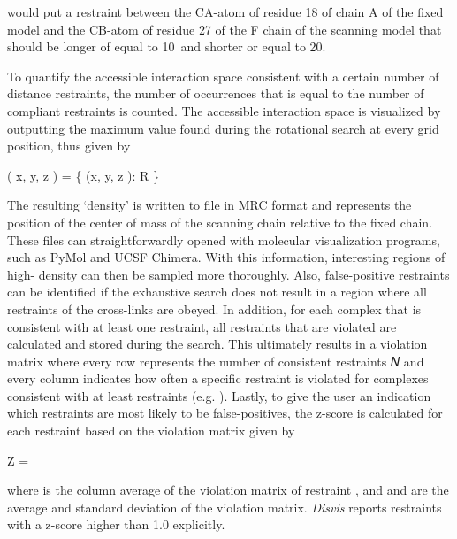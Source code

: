 would put a restraint between the CA-atom of residue 18 of chain A of the fixed
model and the CB-atom of residue 27 of the F chain of the scanning model that
should be longer of equal to 10\Angstrom\ and shorter or equal to 20\Angstrom.


To quantify the accessible interaction space consistent with a certain number
of distance restraints, the number of occurrences that \m{\redais} is equal to
the number of compliant restraints is counted. The accessible interaction space
is visualized by outputting the maximum value found during the rotational
search at every grid position, thus given by

\placeformula[eq:vizualization]
\startformula
\boldV \left( x, y, z \right) = \max \left\{ \redais\left(x, y, z \right): R \in \boldP \right\}
\stopformula

The resulting ‘density’ is written to file in MRC format and represents the
position of the center of mass of the scanning chain relative to the fixed
chain. These files can straightforwardly opened with molecular visualization
programs, such as PyMol and UCSF Chimera. With this information, interesting
regions of high- density can then be sampled more thoroughly. Also,
false-positive restraints can be identified if the exhaustive search does not
result in a region where all restraints of the cross-links are obeyed. In
addition, for each complex that is consistent with at least one restraint, all
restraints that are violated are calculated and stored during the search. This
ultimately results in a violation matrix where every row represents the number
of consistent restraints 𝑁 and every column indicates how often a specific
restraint is violated for complexes consistent with at least  restraints
(e.g.  ). Lastly, to give the user an
indication which restraints are most likely to be false-positives, the z-score
is calculated for each restraint based on the violation matrix given by

\placeformula[eq:z-score]
\startformula
Z = 
\stopformula

where  is the column average of the violation matrix of restraint ,
and  and \m{\sigma} are the average and standard deviation of the
violation matrix. {\emph{Disvis}} reports restraints with a z-score higher
than 1.0 explicitly.



